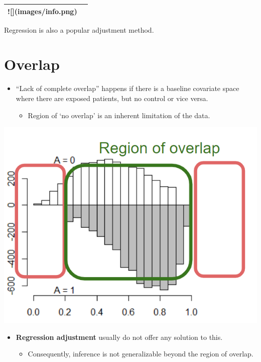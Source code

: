 \documentclass[
]{book}
\providecommand{\tightlist}{%
  \setlength{\itemsep}{0pt}\setlength{\parskip}{0pt}}
\begin{document}
\begin{tabular}{l>{}l}
\toprule
![](images/info.png) & \cellcolor[HTML]{3A3B3C}{\textcolor{white}{When L includes a large number of covariates, matching method would result in a small sample size.}}\\
\bottomrule
\end{tabular}

Regression is also a popular adjustment method.

\hypertarget{overlap}{%
\section{Overlap}\label{overlap}}

\begin{itemize}
\tightlist
\item
  ``Lack of complete overlap'' happens if there is a baseline covariate space where there are exposed patients, but no control or vice versa.

  \begin{itemize}
  \tightlist
  \item
    Region of `no overlap' is an inherent limitation of the data.
  \end{itemize}
\end{itemize}

\includegraphics[width=8.47in]{images/overlap}

\begin{itemize}
\tightlist
\item
  \textbf{Regression adjustment} usually do not offer any solution to this.

  \begin{itemize}
  \tightlist
  \item
    Consequently, inference is not generalizable beyond the region of overlap.
  \end{itemize}
\end{itemize}
\end{document}
